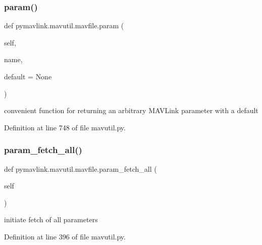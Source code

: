 \mbox{\label{classpymavlink_1_1mavutil_1_1mavfile_af62c2fd5d5957067fd74eef6c08dcd9a}} 
\subsubsection{\texorpdfstring{param()}{param()}}
{\footnotesize\ttfamily def pymavlink.\+mavutil.\+mavfile.\+param (\begin{DoxyParamCaption}\item[{}]{self,  }\item[{}]{name,  }\item[{}]{default = {\ttfamily None} }\end{DoxyParamCaption})}

\begin{DoxyVerb}convenient function for returning an arbitrary MAVLink
   parameter with a default\end{DoxyVerb}
 

Definition at line 748 of file mavutil.\+py.

\mbox{\label{classpymavlink_1_1mavutil_1_1mavfile_a5337d04307871f7ac873a17eb24b3180}} 
\subsubsection{\texorpdfstring{param\_fetch\_all()}{param\_fetch\_all()}}
{\footnotesize\ttfamily def pymavlink.\+mavutil.\+mavfile.\+param\+\_\+fetch\+\_\+all (\begin{DoxyParamCaption}\item[{}]{self }\end{DoxyParamCaption})}

\begin{DoxyVerb}initiate fetch of all parameters\end{DoxyVerb}
 

Definition at line 396 of file mavutil.\+py.

\mbox{\label{classpymavlink_1_1mavutil_1_1mavfile_a37e35b77e1bba0d32ec8ff37b79b0e23}} 
